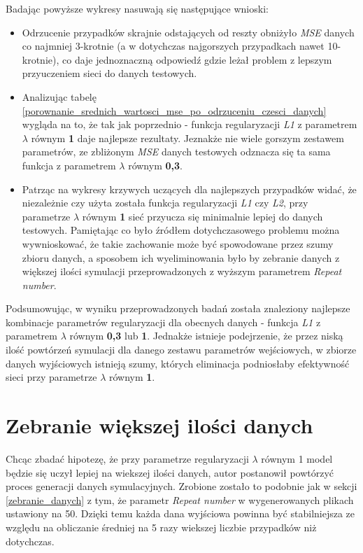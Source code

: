 \documentclass[12pt]{aghdpl}
\begin{document}
		Badając powyższe wykresy nasuwają się następujące wnioski:
		\begin{itemize}
		\item Odrzucenie przypadków skrajnie odstających od reszty obniżyło \textit{MSE} danych co najmniej 3-krotnie (a w dotychczas najgorszych przypadkach nawet 10-krotnie), co daje jednoznaczną odpowiedź gdzie leżał problem z lepszym przyuczeniem sieci do danych testowych.
		\item Analizując tabelę \ref{porownanie_srednich_wartosci_mse_po_odrzuceniu_czesci_danych} wygląda na to, że tak jak poprzednio - funkcja regularyzacji \textit{L1} z parametrem $\lambda$ równym \textbf{1} daje najlepsze rezultaty. Jeznakże nie wiele gorszym zestawem parametrów, ze zbliżonym \textit{MSE} danych testowych odznacza się ta sama funkcja z parametrem $\lambda$ równym \textbf{0,3}.
		\item Patrząc na wykresy krzywych uczących dla najlepszych przypadków widać, że niezależnie czy użyta została funkcja regularyzacji \textit{L1} czy \textit{L2}, przy parametrze $\lambda$ równym \textbf{1} sieć przyucza się minimalnie lepiej do danych testowych. Pamiętając co było źródłem dotychczasowego problemu można wywnioskować, że takie zachowanie może być spowodowane przez szumy zbioru danych, a sposobem ich wyeliminowania było by zebranie danych z większej ilości symulacji przeprowadzonych z wyższym parametrem \textit{Repeat number}.
		\end{itemize}
		
		Podsumowując, w wyniku przeprowadzonych badań została znaleziony najlepsze kombinacje parametrów regularyzacji dla obecnych danych - funkcja \textit{L1} z parametrem $\lambda$ równym \textbf{0,3} lub \textbf{1}. Jednakże istnieje podejrzenie, że przez niską ilość powtórzeń symulacji dla danego zestawu parametrów wejściowych, w zbiorze danych wyjściowych istnieją szumy, których eliminacja podniosłaby efektywność sieci przy parametrze $\lambda$ równym \textbf{1}.
		
		\section{Zebranie większej ilości danych}	
		Chcąc zbadać hipotezę, że przy parametrze regularyzacji $\lambda$ równym 1 model będzie się uczył lepiej na wiekszej ilości danych, autor postanowił powtórzyć proces generacji danych symulacyjnych. Zrobione zostało to podobnie jak w sekcji \ref{zebranie_danych} z tym, że parametr \textit{Repeat number} w wygenerowanych plikach ustawiony na 50. Dzięki temu każda dana wyjściowa powinna być stabilniejsza ze względu na obliczanie średniej na 5 razy wiekszej liczbie przypadków niż dotychczas.
		
\end{document}
